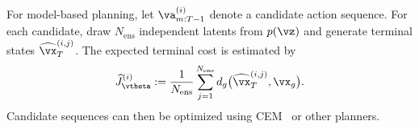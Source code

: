 For model-based planning, let $\va_{m:T-1}^{(i)}$ denote a candidate
action sequence.  For each candidate, draw $N_{\mathrm{ens}}$ independent
latents from $p(\vz)$ and generate terminal states
$\widehat{\vx}_{T}^{(i,j)}$.  The expected terminal cost is estimated by
\begin{equation}
\widehat{J}_{\vtheta}^{(i)}
:=
\frac{1}{N_{\mathrm{ens}}}
\sum_{j=1}^{N_{\mathrm{ens}}}
d_g
\bigl(
\widehat{\vx}_T^{(i,j)},
\vx_g
\bigr).
\label{eq:vsf_world_model_cost}
\end{equation}
Candidate sequences can then be optimized using CEM~\citep{rubinstein1999cross} or other planners.


